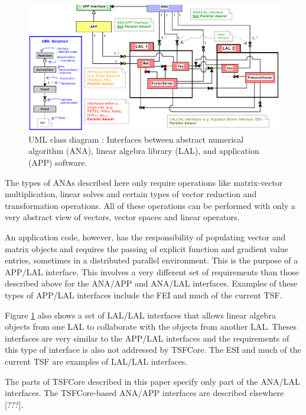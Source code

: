 \documentclass[10pt,fleqn]{article}
\begin{document}
{\bsinglespace
\begin{figure}[t]
\begin{center}
\includegraphics*[bb= 0.245in 2.95in 10.85in 8.60in,angle=0,scale=0.50
]{analal}
\end{center}
\caption{
\label{tsfcore:fig:ANA_LAL_APP}
UML \cite{ref:booch_et_al_1999} class diagram : Interfaces between abstract numerical algorithm
(ANA), linear algebra library (LAL), and application (APP) software.
}
\end{figure}
\esinglespace}

The types of ANAs described here only require operations like
matrix-vector multiplication, linear solves and certain types of
vector reduction and transformation operations.  All of these
operations can be performed with only a very abstract view of vectors,
vector spaces and linear operators.

An application code, however, has the responsibility of populating
vector and matrix objects and requires the passing of explicit
function and gradient value entries, sometimes in a distributed
parallel environment.  This is the purpose of a APP/LAL interface.
This involves a very different set of requirements than those
described above for the ANA/APP and ANA/LAL interfaces.  Examples of
these types of APP/LAL interfaces include the FEI \cite{ref:fei} and
much of the current TSF.

Figure \ref{tsfcore:fig:ANA_LAL_APP} also shows a set of LAL/LAL
interfaces that allows linear algebra objects from one LAL to
collaborate with the objects from another LAL.  Theses interfaces are
very similar to the APP/LAL interfaces and the requirements of this
type of interface is also not addressed by TSFCore.  The ESI
\cite{ref:esi_2001} and much of the current TSF are examples of
LAL/LAL interfaces.

The parts of TSFCore described in this paper specify only part of the
ANA/LAL interfaces.  The TSFCore-based ANA/APP interfaces are 
described elsewhere [???].
\end{document}
